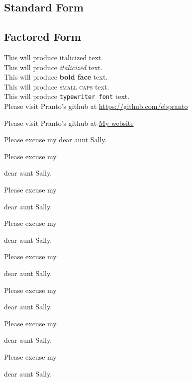 \documentclass[11pt]{article}
\begin{document}
    \subsection*{Standard Form}
    \subsection*{Factored Form}






This will produce italicized text.\\
This will produce \textit{italicized} text.\\
This will produce \textbf{bold face} text.\\
This will produce \textsc{small caps} text.\\
This will produce \texttt{typewriter font} text.\\
Please visit Pranto's github at \url{https://github.com/ebpranto}

Please visit Pranto's github at \href{https://github.com/ebpranto}{My website}  %

\vspace{1cm}

Please excuse my dear aunt Sally.

Please excuse my \begin{large}dear aunt Sally.\end{large}

Please excuse my \begin{Large}dear aunt Sally.\end{Large}

Please excuse my \begin{huge}dear aunt Sally.\end{huge}

Please excuse my \begin{Huge}dear aunt Sally.\end{Huge}

Please excuse my \begin{normalsize}dear aunt Sally.\end{normalsize}

Please excuse my \begin{small}dear aunt Sally.\end{small}


Please excuse my \begin{scriptsize}dear aunt Sally.\end{scriptsize}
\end{document}
